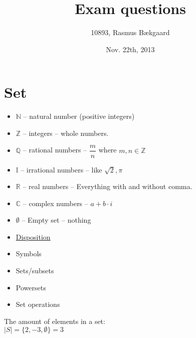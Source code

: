 \documentclass[english,10pt,a4paper]{article}
\title{Exam questions}
\author{10893, Rasmus Bækgaard}
\date{Nov. 22th, 2013}
\begin{document}
\maketitle

\tableofcontents
\newpage

\section{Set}

\begin{minipage}[t]{0.7\linewidth}
\begin{theo}[Symbols] 
\begin{itemize}
\item $\mathbb{N}$ -- natural number (positive integers)
\item $\mathbb{Z}$ -- integers -- whole numbers.
\item $\mathbb{Q}$ -- rational numbers -- $\dfrac{m}{n}$ where $m, n \in \mathbb{Z}$
\item $\mathbb{I}$ -- irrational numbers -- like $\sqrt{2}, \pi$
\item $\mathbb{R}$ -- real numbers -- Everything with and without comma.
\item $\mathbb{C}$ -- complex numbers -- $a+b\cdot i$
\item $\emptyset$ -- Empty set -- nothing
\end{itemize}
\end{theo}
\end{minipage}
\hspace{0.25cm}
\begin{minipage}{0.25\linewidth}
\begin{itemize}
\item[] \underline{Disposition}
\item Symbols
\item Sets/subsets
\item Powersets
\item Set operations
\end{itemize}
\end{minipage}

\begin{theo} 
The amount of elements in a set:\\
$|S| = \{ 2, -3, \emptyset\} = 3$

\end{theo}
\end{document}
